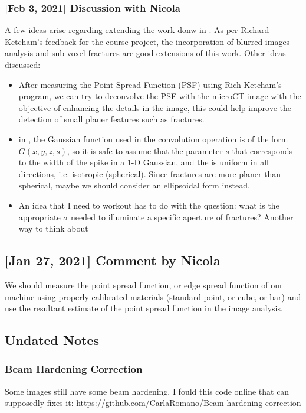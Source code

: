 \documentclass[12pt,titlepage]{article}
\begin{document}
\subsubsection{[Feb 3, 2021] Discussion with Nicola}
A few ideas arise regarding extending the work donw in \cite{Voorn2013}. As per Richard Ketcham's feedback for the course project, the incorporation of blurred images analysis and sub-voxel fractures are good extensions of this work. Other ideas discussed:
\begin{itemize}
	\item After measuring the Point Spread Function (PSF) using Rich Ketcham's program, we can try to deconvolve the PSF with the microCT image with the objective of enhancing the details in the image, this could help improve the detection of small planer features such as fractures. 
	\item in \cite{Voorn2013}, the Gaussian function used in the convolution operation is of the form $ G(x,y,z,s)$, so it is safe to assume that the parameter $s$ that corresponds to the width of the spike in a 1-D Gaussian, and the  is uniform in all directions, i.e. isotropic (spherical). Since fractures are more planer than spherical, maybe we should consider an ellipsoidal form instead. 
	\item An idea that I need to workout has to do with the question: what is the appropriate $\sigma$  needed to illuminate a specific aperture of fractures? Another way to think about
\end{itemize} 

\subsection{[Jan 27, 2021] Comment by Nicola}
We should measure the point spread function, or edge spread function of our machine using properly calibrated materials (standard point, or cube, or bar) and use the resultant estimate of the point spread function in the image analysis. 

\subsection{Undated Notes}
\subsubsection{Beam Hardening Correction}
Some images still have some beam hardening, I fould this code online that can supposedly fixes it: https://github.com/CarlaRomano/Beam-hardening-correction
\end{document}
